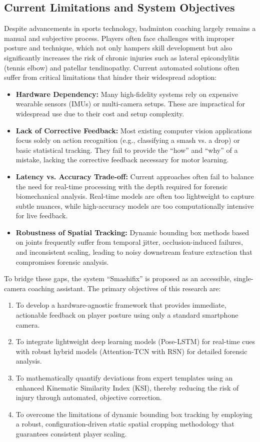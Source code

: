 \documentclass[pdflatex,sn-mathphys-num]{sn-jnl}
\theoremstyle{thmstyleone}%
\theoremstyle{thmstyletwo}%
\theoremstyle{thmstylethree}%
\begin{document}
\subsection{Current Limitations and System Objectives}
Despite advancements in sports technology, badminton coaching largely remains a manual and subjective process. Players often face challenges with improper posture and technique, which not only hampers skill development but also significantly increases the risk of chronic injuries such as lateral epicondylitis (tennis elbow) and patellar tendinopathy. Current automated solutions often suffer from critical limitations that hinder their widespread adoption:
\begin{itemize}
    \item \textbf{Hardware Dependency:} Many high-fidelity systems rely on expensive wearable sensors (IMUs) or multi-camera setups. These are impractical for widespread use due to their cost and setup complexity.
    \item \textbf{Lack of Corrective Feedback:} Most existing computer vision applications focus solely on action recognition (e.g., classifying a smash vs. a drop) or basic statistical tracking. They fail to provide the ``how'' and ``why'' of a mistake, lacking the corrective feedback necessary for motor learning.
    \item \textbf{Latency vs. Accuracy Trade-off:} Current approaches often fail to balance the need for real-time processing with the depth required for forensic biomechanical analysis. Real-time models are often too lightweight to capture subtle nuances, while high-accuracy models are too computationally intensive for live feedback.
    \item \textbf{Robustness of Spatial Tracking:} Dynamic bounding box methods based on joints frequently suffer from temporal jitter, occlusion-induced failures, and inconsistent scaling, leading to noisy downstream feature extraction that compromises forensic analysis.
\end{itemize}

To bridge these gaps, the system ``Smashifix'' is proposed as an accessible, single-camera coaching assistant. The primary objectives of this research are:
\begin{enumerate}
    \item To develop a hardware-agnostic framework that provides immediate, actionable feedback on player posture using only a standard smartphone camera.
    \item To integrate lightweight deep learning models (Pose-LSTM) for real-time cues with robust hybrid models (Attention-TCN with RSN) for detailed forensic analysis.
    \item To mathematically quantify deviations from expert templates using an enhanced Kinematic Similarity Index (KSI), thereby reducing the risk of injury through automated, objective correction.
    \item To overcome the limitations of dynamic bounding box tracking by employing a robust, configuration-driven static spatial cropping methodology that guarantees consistent player scaling.
\end{enumerate}
\end{document}
